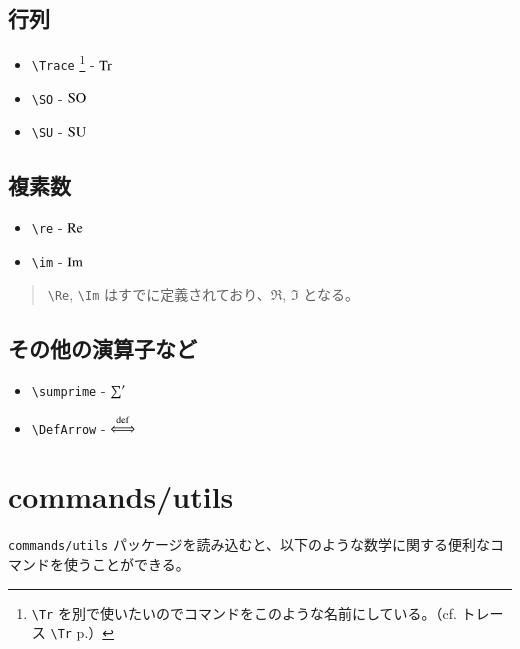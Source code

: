 \documentclass[oneside,10pt,a4paper]{jsarticle}
\begin{document}
  \subsection{行列}

  \begin{itemize}
    \item \verb|\Trace| \footnote{\verb|\Tr| を別で使いたいのでコマンドをこのような名前にしている。（cf.  トレース \verb|\Tr| p.\pageref{Tr}）} - $ \operatorname{Tr} $
    \item \verb|\SO| - $ \operatorname{SO} $
    \item \verb|\SU| - $ \operatorname{SU} $
  \end{itemize}

  \newpage

  \subsection{複素数}

  \begin{itemize}
    \item \verb|\re| - $ \operatorname{Re} $
    \item \verb|\im| - $ \operatorname{Im} $
  \end{itemize}

  \Remark
  \begin{quote}
    \verb|\Re|, \verb|\Im| はすでに定義されており、$ \Re $, $ \Im $ となる。
  \end{quote}

  \subsection{その他の演算子など}

  \begin{itemize}
    \item \verb|\sumprime| - $ \operatorname*{{\sum}^{\prime}} $
    \item \verb|\DefArrow| - $ \operatorname{{\stackrel{\mathrm{def}}{\Longleftrightarrow}}} $
  \end{itemize}

  \newpage

  \section{commands/utils}

  \verb|commands/utils| パッケージを読み込むと、以下のような数学に関する便利なコマンドを使うことができる。
\end{document}
